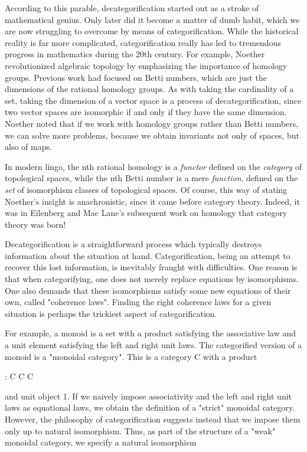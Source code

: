 According to this parable, decategorification started out as a stroke
of mathematical genius.  Only later did it become a matter of dumb
habit, which we are now struggling to overcome by means of
categorification.  While the historical reality is far more
complicated, categorification really has led to tremendous progress in
mathematics during the 20th century.  For example, Noether
revolutionized algebraic topology by emphasizing the importance of
homology groups.  Previous work had focused on Betti numbers, which
are just the dimensions of the rational homology groups.  As with
taking the cardinality of a set, taking the dimension of a vector
space is a process of decategorification, since two vector spaces are
isomorphic if and only if they have the same dimension.  Noether noted
that if we work with homology groups rather than Betti numbers, we can
solve more problems, because we obtain invariants not only of spaces,
but also of maps.  

In modern lingo, the nth rational homology is a \emph{functor} defined
on the \emph{category} of topological spaces, while the nth Betti number is
a mere \emph{function}, defined on the \emph{set} of isomorphism classes of
topological spaces.  Of course, this way of stating Noether's insight
is anachronistic, since it came before category theory.  Indeed, it
was in Eilenberg and Mac Lane's subsequent work on homology that
category theory was born!

Decategorification is a straightforward process which typically
destroys information about the situation at hand.  Categorification,
being an attempt to recover this lost information, is inevitably
fraught with difficulties.  One reason is that when categorifying, one
does not merely replace equations by isomorphisms.  One also demands
that these isomorphisms satisfy some new equations of their own,
called "coherence laws".  
Finding the right coherence laws for a given
situation is perhaps the trickiest aspect of categorification.

For example, a monoid is a set with a product satisfying the associative
law and a unit element satisfying the left and right unit laws.   The
categorified version of a monoid is a "monoidal category".   
This is a category C with a product 

\otimes : C \times  C \to  C 

and unit object 1.  If we naively impose associativity and the left
and right unit laws as equational laws, we obtain the definition of a
"strict" monoidal category.  However, the philosophy of
categorification suggests instead that we impose them only up to
natural isomorphism.  Thus, as part of the structure of a "weak"
monoidal category, we specify a natural isomorphism

